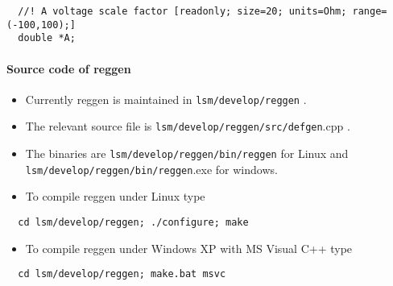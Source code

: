 \footnotesize\begin{verbatim}  //! A voltage scale factor [readonly; size=20; units=Ohm; range=(-100,100);]
  double *A;
\end{verbatim}
\normalsize
\hypertarget{fields_src}{}\paragraph{Source code of reggen}\label{fields_src}
\begin{itemize}
\item Currently reggen is maintained in {\tt lsm/develop/reggen} .\item The relevant source file is {\tt lsm/develop/reggen/src/defgen}.cpp .\item The binaries are {\tt lsm/develop/reggen/bin/reggen} for Linux and {\tt lsm/develop/reggen/bin/reggen}.exe for windows.\item To compile reggen under Linux type\end{itemize}




\footnotesize\begin{verbatim}  cd lsm/develop/reggen; ./configure; make
\end{verbatim}
\normalsize


\begin{itemize}
\item To compile reggen under Windows XP with MS Visual C++ type\end{itemize}




\footnotesize\begin{verbatim}  cd lsm/develop/reggen; make.bat msvc
\end{verbatim}
\normalsize
 